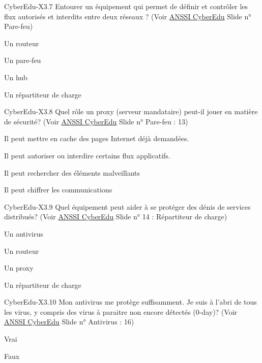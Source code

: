 \begin{multi}[multiple=true]{CyberEdu-X3.7}
	Entourer un équipement qui permet de définir et contrôler les flux autorisés et interdits entre deux réseaux ? (Voir \href{https://www.ssi.gouv.fr/administration/formations/cyberedu/contenu-pedagogique-cyberedu/}{ANSSI CyberEdu} Slide n° Pare-feu)
\item Un routeur
\item* Un pare-feu
\item Un hub
\item Un répartiteur de charge
\end{multi}
\begin{multi}[multiple=true]{CyberEdu-X3.8}
	Quel rôle un proxy (serveur mandataire) peut-il jouer en matière de sécurité? (Voir \href{https://www.ssi.gouv.fr/administration/formations/cyberedu/contenu-pedagogique-cyberedu/}{ANSSI CyberEdu} Slide n° Pare-feu : 13)
\item Il peut mettre en cache des pages Internet déjà demandées.
\item* Il peut autoriser ou interdire certains flux applicatifs.
\item Il peut rechercher des éléments malveillants
\item Il peut chiffrer les communications
\end{multi}
\begin{multi}[multiple=true]{CyberEdu-X3.9}
	Quel équipement peut aider à se protéger des dénis de services distribués? (Voir \href{https://www.ssi.gouv.fr/administration/formations/cyberedu/contenu-pedagogique-cyberedu/}{ANSSI CyberEdu} Slide n° 14 : Répartiteur de charge)
\item Un antivirus
\item Un routeur
\item Un proxy
\item* Un répartiteur de charge
\end{multi}
\begin{multi}[multiple=true]{CyberEdu-X3.10}
	Mon antivirus me protège suffisamment. Je suis à l'abri de tous les virus, y compris des virus à paraitre non encore détectés (0-day)? (Voir \href{https://www.ssi.gouv.fr/administration/formations/cyberedu/contenu-pedagogique-cyberedu/}{ANSSI CyberEdu} Slide n° Antivirus : 16)
\item Vrai
\item* Faux
\end{multi}
